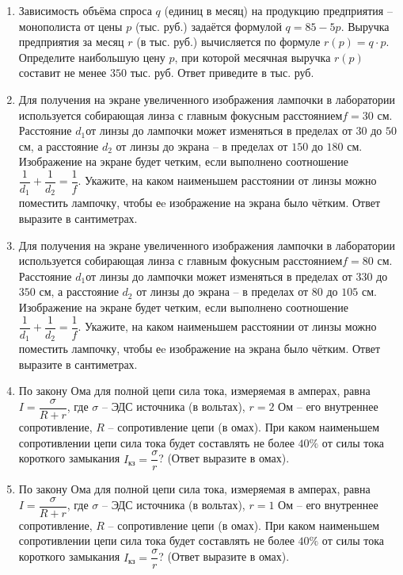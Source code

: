 \documentclass[12pt, a4paper]{article}
\begin{document}
\begin{enumerate}
		\item Зависимость объёма спроса \( q \) (единиц в месяц) на продукцию предприятия – монополиста от цены \( p \) (тыс. руб.) задаётся формулой \( q=85-5p \). Выручка предприятия за месяц \( r \) (в тыс. руб.) вычисляется по формуле \( r(p)=q\cdot p \). Определите наибольшую цену \( p \), при которой месячная выручка \( r(p) \) составит не менее \( 350 \) тыс. руб. Ответ приведите в тыс. руб.
		\item Для получения на экране увеличенного изображения лампочки в лаборатории используется собирающая линза с главным фокусным расстоянием\(  f = 30 \) см. Расстояние \( d_1  \)от линзы до лампочки может изменяться в пределах от \( 30 \) до \( 50 \) см, а расстояние \( d_2 \) от линзы до экрана – в пределах от \( 150 \) до \( 180 \) см. Изображение на экране будет четким, если выполнено соотношение \( \dfrac{1}{d_1}+\dfrac{1}{d_2}=\dfrac{1}{f} \). Укажите, на каком наименьшем расстоянии от линзы можно поместить лампочку, чтобы еe изображение на экрана было чётким. Ответ выразите в сантиметрах.
		\item Для получения на экране увеличенного изображения лампочки в лаборатории используется собирающая линза с главным фокусным расстоянием\(  f = 80 \) см. Расстояние \( d_1  \)от линзы до лампочки может изменяться в пределах от \( 33	0 \) до \( 350 \) см, а расстояние \( d_2 \) от линзы до экрана – в пределах от \( 80 \) до \( 105 \) см. Изображение на экране будет четким, если выполнено соотношение \( \dfrac{1}{d_1}+\dfrac{1}{d_2}=\dfrac{1}{f} \). Укажите, на каком наименьшем расстоянии от линзы можно поместить лампочку, чтобы еe изображение на экрана было чётким. Ответ выразите в сантиметрах.
		\item По закону Ома для полной цепи сила тока, измеряемая в амперах, равна \( I=\dfrac{\sigma}{R+r} \), где \(\sigma\) – ЭДС источника (в вольтах), \(r=2\) Ом – его внутреннее сопротивление, \(R\) – сопротивление цепи (в омах). При каком наименьшем сопротивлении цепи сила тока будет составлять не более \(40\% \) от силы тока короткого замыкания \( I_{кз} =\dfrac{\sigma}{r}\)? (Ответ выразите в омах).
		\item По закону Ома для полной цепи сила тока, измеряемая в амперах, равна \( I=\dfrac{\sigma}{R+r} \), где \(\sigma\) – ЭДС источника (в вольтах), \(r=1\) Ом – его внутреннее сопротивление, \(R\) – сопротивление цепи (в омах). При каком наименьшем сопротивлении цепи сила тока будет составлять не более \( 40\% \) от силы тока короткого замыкания \( I_{кз} =\dfrac{\sigma}{r}\)? (Ответ выразите в омах).

\end{enumerate}
\end{document}
